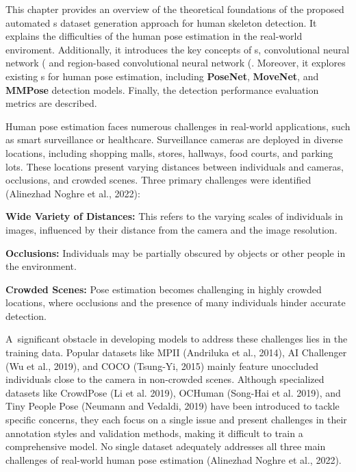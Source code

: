 This chapter provides an overview of the theoretical foundations of the proposed automated \NN\-s dataset generation approach for human skeleton detection. It explains the difficulties of the human pose estimation in the real-world enviroment. Additionally, it introduces the key concepts of \NN\-s, convolutional neural network (\CNN\) and region-based convolutional neural network (\RCNN\). Moreover, it explores existing \NN\-s for human pose estimation, including {\bf PoseNet}, {\bf MoveNet}, and {\bf MMPose} detection models. Finally, the detection performance evaluation metrics are described.

Human pose estimation faces numerous challenges in real-world applications, such as smart surveillance or healthcare. Surveillance cameras are deployed in diverse locations, including shopping malls, stores, hallways, food courts, and parking lots. These locations present varying distances between individuals and cameras, occlusions, and crowded scenes. Three primary challenges were identified (\scc Alinezhad Noghre et al., 2022):

\startitemize[n]
    \item {\bf Wide Variety of Distances:} This refers to the varying scales of individuals in images, influenced by their distance from the camera and the image resolution.
    \item {\bf Occlusions:} Individuals may be partially obscured by objects or other people in the environment.
    \item {\bf Crowded Scenes:} Pose estimation becomes challenging in highly crowded locations, where occlusions and the presence of many individuals hinder accurate detection.
\stopitemize

A~significant obstacle in developing models to address these challenges lies in the training data. Popular datasets like MPII (\scc Andriluka et al., 2014), AI Challenger (\scc Wu et al., 2019), and COCO (\scc Tsung-Yi, 2015) mainly feature unoccluded individuals close to the camera in non-crowded scenes. Although specialized datasets like CrowdPose (\scc Li et al. 2019), OCHuman (\scc Song-Hai et al. 2019), and Tiny People Pose (\scc Neumann and Vedaldi, 2019) have been introduced to tackle specific concerns, they each focus on a single issue and present challenges in their annotation styles and validation methods, making it difficult to train a comprehensive model. No single dataset adequately addresses all three main challenges of real-world human pose estimation (\scc Alinezhad Noghre et al., 2022).

